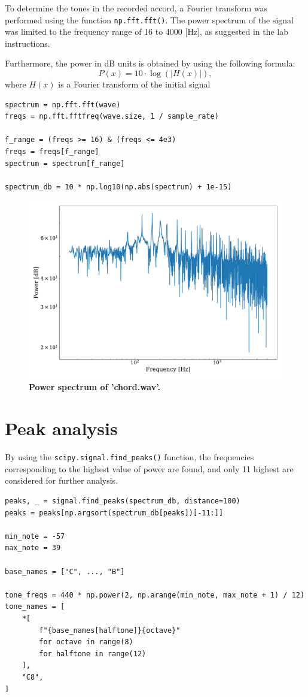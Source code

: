 \documentclass[13pt,a4paper]{article}
\begin{document}
To determine the tones in the recorded accord, a Fourier transform was performed using the function \verb|np.fft.fft()|. The power spectrum of the signal was limited to the frequency range of 16 to 4000 [Hz], as suggested in the lab instructions.

Furthermore, the power in dB units is obtained by using the following formula:
$$
P(x) = 10 \cdot \log(|H(x)|),
$$
where $H(x)$ is a Fourier transform of the initial signal

\begin{lstlisting}[caption={\textbf{Code snippet for calculating the power spectrum.}}]
spectrum = np.fft.fft(wave)
freqs = np.fft.fftfreq(wave.size, 1 / sample_rate)

f_range = (freqs >= 16) & (freqs <= 4e3)
freqs = freqs[f_range]
spectrum = spectrum[f_range]

spectrum_db = 10 * np.log10(np.abs(spectrum) + 1e-15)
\end{lstlisting}

\begin{figure}[ht!]
    \centering
    \caption{\textbf{Power spectrum of 'chord.wav'.}}
    \includegraphics[width=1\textwidth]{fourier.pdf}
\end{figure}


\section{Peak analysis}
By using the \verb|scipy.signal.find_peaks()| function, the frequencies corresponding to the highest value of power are found, and only 11 highest are considered for further analysis.

\begin{lstlisting}[caption={\textbf{Code snippet for identifying the semitones, based on the provided MATLAB code.}}]
peaks, _ = signal.find_peaks(spectrum_db, distance=100)
peaks = peaks[np.argsort(spectrum_db[peaks])[-11:]]

min_note = -57
max_note = 39

base_names = ["C", ..., "B"]

tone_freqs = 440 * np.power(2, np.arange(min_note, max_note + 1) / 12)
tone_names = [
    *[
        f"{base_names[halftone]}{octave}"
        for octave in range(8)
        for halftone in range(12)
    ],
    "C8",
]
\end{lstlisting}
\end{document}
